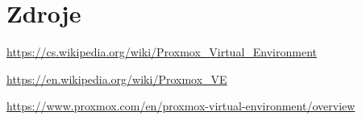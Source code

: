 \printbibliography

\chapter*{Zdroje}

\url{https://cs.wikipedia.org/wiki/Proxmox_Virtual_Environment}

\url{https://en.wikipedia.org/wiki/Proxmox_VE}

\url{https://www.proxmox.com/en/proxmox-virtual-environment/overview}
